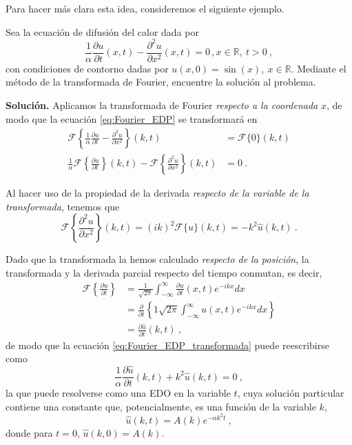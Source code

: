 Para hacer más clara esta idea, consideremos el siguiente ejemplo.

\begin{ejemplo}
    Sea la ecuación de difusión del calor dada por
    \begin{equation} \label{eq:Fourier_EDP}
        \frac{1}{\alpha} \frac{\partial u}{\partial t} (x,t) - \frac{\partial^2 u}{\partial x^2}(x,t) = 0 \, , x \in \mathbb{R}, \ t>0 \ ,
    \end{equation}
    con condiciones de contorno dadas por $u(x,0) = \sin(x), \ x \in \mathbb{R}$. Mediante el método de la transformada de Fourier, encuentre la solución al problema.
    
    \textbf{Solución.} Aplicamos la transformada de Fourier \emph{respecto a la coordenada} $x$, de modo que la ecuación \eqref{eq:Fourier_EDP} se transformará en
    \begin{align}
        \mathcal{F}\left\{ \frac{1}{\alpha} \frac{\partial u}{\partial t} - \frac{\partial^2 u}{\partial x^2} \right\}(k, t) & = \mathcal{F}\{0\}(k,t) \nonumber \\
        \frac{1}{\alpha}\mathcal{F}\left\{ \frac{\partial u}{\partial t} \right\}(k, t) - \mathcal{F}\left\{ \frac{\partial^2 u}{\partial x^2} \right\}(k, t) & = 0 \ . \label{eq:Fourier_EDP_transformada}
    \end{align}

    Al hacer uso de la propiedad de la derivada \emph{respecto de la variable de la transformada}, tenemos que
    \begin{equation}
        \mathcal{F}\left\{ \frac{\partial^2 u}{\partial x^2} \right\}(k, t) = (ik)^2 \mathcal{F}\{u\}(k,t) = -k^2 \hat{u}(k,t) \ .
    \end{equation}
    
    Dado que la transformada la hemos calculado \emph{respecto de la posición}, la transformada y la derivada parcial respecto del tiempo conmutan, es decir,
    \begin{align}
        \mathcal{F} \left\{ \frac{\partial u}{\partial t} \right\} & = \frac{1}{\sqrt{2\pi}} \int_{-\infty}^\infty \frac{\partial u}{\partial t} (x,t) e^{-ikx} dx \nonumber \\
        & = \frac{\partial }{\partial t} \left\{ {1}{\sqrt{2\pi}} \int_{-\infty}^\infty u(x,t) e^{-ikx} dx  \right\} \nonumber \\
        & = \frac{\partial \hat{u}}{\partial t}(k,t) \ ,
    \end{align}
    de modo que la ecuación \eqref{eq:Fourier_EDP_transformada} puede reescribirse como
    \begin{equation} \label{eq:EDP_fourier_reducida}
        \frac{1}{\alpha} \frac{\partial \hat{u}}{\partial t}(k,t) + k^2 \hat{u}(k,t) = 0 \ ,
    \end{equation}
    la que puede resolverse como una EDO en la variable $t$, cuya solución particular contiene una constante que, potencialmente, es una función de la variable $k$,
    \begin{equation} \label{eq:solucion_en_fourier}
        \hat{u}(k,t) = A(k) e^{-\alpha k^2 t} \ ,
    \end{equation}
    donde para $t=0$, $\hat{u}(k,0) = A(k)$.


\end{ejemplo}

